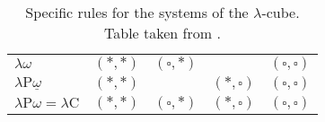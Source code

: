 \documentclass[12pt,toc=bibliography,numbers=noendperiod,
               footnotes=multiple,twoside]{scrartcl}
\begin{document}
\begin{enumerate}
\begin{table}[h]
\begin{tabular}{l l l l l}
        \(\lambda\omega\) & \((*,*)\) & \((\square, *)\) & & \((\square, \square)\) \\

        \(\lambda\textrm{P}\underline{\omega}\) & \((*,*)\) & & \((*,\square)\) & \((\square, \square)\) \\

        \(\lambda\textrm{P}\omega = \lambda\textrm{C}\) & \((*,*)\) & \((\square, *)\) & \((*,\square)\) & \((\square, \square)\) \\

        \bottomrule
    \end{tabular}
    \caption{Specific rules for the systems of the \(\lambda\)-cube. Table taken from \textcite[205]{barendregt_lambda_1992}.}
    \label{tab:lambda-cube-s-rules}
\end{table}
\end{enumerate}
\end{document}
